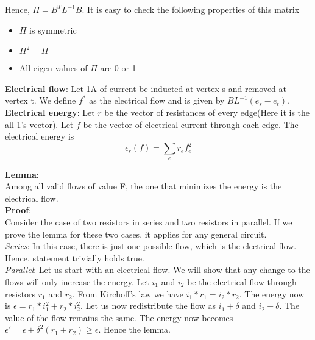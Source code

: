 \documentclass[BTech]{iitmdiss}
\begin{document}
 		     Hence, $\Pi = B^{T} L^{-1} B$. It is easy to check the following properties of this matrix
 		     
 		     \begin{itemize}
 		      \item 
			$\Pi$ is symmetric
		      \item
			$\Pi^2 = \Pi$
		      \item
			All eigen values of $\Pi$ are 0 or 1
 		     \end{itemize}

 		    \textbf{Electrical flow}: Let 1A of current be inducted at vertex s and removed at vertex t. We define $f^{\ast}$ as the electrical 
 		    flow and is given by $BL^{-1}(e_s-e_t)$. \\
 		    
 		    \textbf{Electrical energy}: Let $r$ be the vector of resistances of every edge(Here it is the all 1's vector). Let $f$ be the 
 		    vector of electrical current through each edge. The electrical energy is
 		    $$\epsilon_r(f) = \displaystyle\sum_{e}r_e f_{e}^{2}$$
 		    
 		    \textbf{Lemma}: \\
		    Among all valid flows of value F, the one that minimizes the energy is the electrical flow. \\
		    
		  \textbf{Proof}: \\
		    Consider the case of two resistors in series and two resistors in parallel. If we prove the lemma for these two cases, it applies for 
		    any general circuit. \\
		    
		    \textit{Series}: In this case, there is just one possible flow, which is the electrical flow. Hence, statement trivially holds true. \\
		    
		    \textit{Parallel}:  Let us start with an electrical flow. We will show that any change to the flows will only increase the energy.
		    Let $i_1$ and $i_2$ be the electrical flow through resistors $r_1$ and $r_2$. From Kirchoff's law we have $i_1 \ast r_1 = i_2 \ast r_2 $.
		    The energy now is $\epsilon = r_1  \ast i_1^2 + r_2 \ast i_2^2$. Let us now redistribute the flow as $i_1 + \delta$ and $i_2 - \delta$. 
		    The value of the flow remains the same. The energy now becomes $\epsilon' = \epsilon + \delta^2(r_1+r_2) \geq \epsilon$. Hence the lemma. \\
 		     
\end{document}
